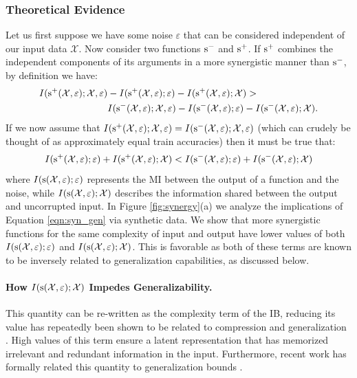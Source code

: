 \documentclass{article}
\theoremstyle{definition}
\theoremstyle{remark}
\begin{document}
\subsubsection{Theoretical Evidence}
Let us first suppose we have some noise $\varepsilon$ that can be considered independent of our input data $\mathcal{X}$. Now consider two functions $\textup{s}^-$ and $\textup{s}^+$. If $\textup{s}^+$ combines the independent components of its arguments in a more synergistic manner than $\textup{s}^-$, by definition we have: 
\begin{equation}
\begin{split}
\label{eqn:syn}
    I(\textup{s}^+(\mathcal{X},\varepsilon);\mathcal{X},\varepsilon)& - I(\textup{s}^+(\mathcal{X},\varepsilon);\varepsilon) - I(\textup{s}^+(\mathcal{X},\varepsilon);\mathcal{X}) > \\ & I(\textup{s}^-(\mathcal{X},\varepsilon);\mathcal{X},\varepsilon) - I(\textup{s}^-(\mathcal{X},\varepsilon);\varepsilon) - I(\textup{s}^-(\mathcal{X},\varepsilon);\mathcal{X}).
\end{split}
\end{equation}
If we now assume that $I(\textup{s}^+(\mathcal{X},\varepsilon);\mathcal{X},\varepsilon) = I(\textup{s}^-(\mathcal{X},\varepsilon);\mathcal{X},\varepsilon)$ (which can crudely be thought of as approximately equal train accuracies) then it must be true that:
\begin{equation}
\begin{split}
\label{eqn:syn_gen}
     I(\textup{s}^+(\mathcal{X},\varepsilon);\varepsilon) + I(\textup{s}^+(\mathcal{X},\varepsilon);\mathcal{X}) <  I(\textup{s}^-(\mathcal{X},\varepsilon);\varepsilon) + I(\textup{s}^-(\mathcal{X},\varepsilon);\mathcal{X})
\end{split}
\end{equation}
where $I(\textup{s}(\mathcal{X},\varepsilon);\varepsilon)$ represents the MI between the output of a function and the noise, while $I(\textup{s}(\mathcal{X},\varepsilon);\mathcal{X})$ describes the information shared between the output and uncorrupted input. In Figure \ref{fig:synergy}(a) we analyze the implications of Equation \ref{eqn:syn_gen} via synthetic data. We show that more synergistic functions for the same complexity of input and output have lower values of both $I(\textup{s}(\mathcal{X},\varepsilon);\varepsilon)$ and $I(\textup{s}(\mathcal{X},\varepsilon);\mathcal{X})$. This is favorable as both of these terms are known to be inversely related to generalization capabilities, as discussed below.
\paragraph{How $I(\textup{s}(\mathcal{X},\varepsilon);\mathcal{X})$ Impedes Generalizability.} This quantity can be re-written as the complexity term of the IB, reducing its value has repeatedly been shown to be related to compression and generalization \citep{tishby1999information,shwartz2017opening}. High values of this term ensure a latent representation that has memorized irrelevant and redundant information in the input. Furthermore, recent work has formally related this quantity to generalization bounds \citep{kawaguchi2023how}.
\end{document}
